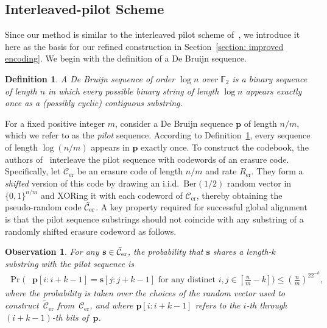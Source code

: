 \documentclass[journal,letterpaper,onecolumn,11pt]{IEEEtran}
\newcommand{\cC}{\mathcal{C}}
\newtheorem{observation}{Observation}
\newtheorem{definition}{Definition}
\begin{document}
\subsection{Interleaved-pilot Scheme}\label{section:interleaved pilot scheme}
Since our method is similar to the interleaved pilot scheme of~\cite{shomorony2021torn}, we introduce it here as the basis for our refined construction in Section~\ref{section: improved encoding}.
We begin with the definition of a De Bruijn sequence. 
\begin{definition}\label{Definition:De Bruijn sequence}
A \emph{De Bruijn sequence} of order $\log n$ over $\mathbb{F}_2$ is a binary sequence of length $n$ in which every possible binary string of length $\log n$ appears exactly once as a (possibly cyclic) contiguous substring.
\end{definition}

For a fixed positive integer $m$, consider a De Bruijn sequence $\mathbf{p}$ of length $n/m$, which we refer to as the \emph{pilot} sequence. 
According to Definition~\ref{Definition:De Bruijn sequence}, every sequence of length $\log(n/m)$ appears in $\mathbf{p}$ exactly once.
To construct the codebook, the authors of~\cite{shomorony2021torn} interleave the pilot sequence with codewords of an erasure code. 
Specifically, let $\cC_{\mathrm{er}}$ be an erasure code of length $n/m$ and rate $R_{\mathrm{er}}$. They form a \emph{shifted} version of this code by drawing an i.i.d.\ $\mathrm{Ber}(1/2)$ random vector in $\{0,1\}^{n/m}$ and XORing it with each codeword of $\cC_{\mathrm{er}}$, thereby obtaining the pseudo-random code $\Tilde{\cC}_{\mathrm{er}}$.
A key property required for successful global alignment is that the pilot sequence substrings should not coincide with any substring of a randomly shifted erasure codeword as follows.
\begin{observation}\label{Lemma: probability of match in ilan's method}
    For any $\mathbf{s} \in \Tilde{\cC}_{\mathrm{er}}$, the probability that $\mathbf{s}$ shares a length-$k$ substring with the pilot sequence is
\begin{align*}
    \Pr\Big(&\mathbf{p}[i:i+k-1]=\mathbf{s}[j:j+k-1] \text{ for any distinct }i,j\in[\tfrac{n}{m}-k]
    \Big) \leq (\tfrac{n}{m})^22^{-k},
\end{align*} 
where the probability is taken over the choices of the random vector used to construct~$\tilde{\cC}_\text{er}$ from~$\cC_\text{er}$, and where $\mathbf{p}[i:i+k-1]$ refers to the $i$-th through $(i+k-1)$-th bits of~$\mathbf{p}$.
\end{observation}
\end{document}
